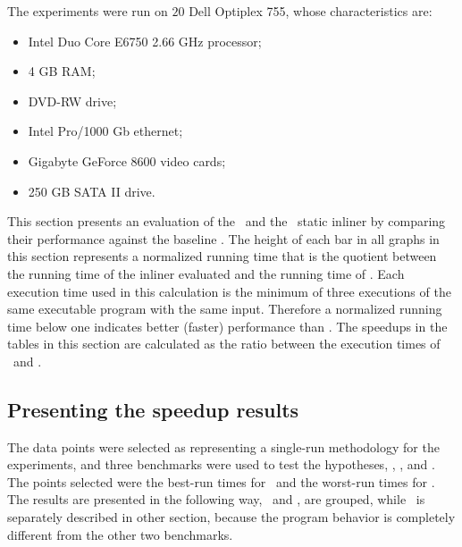 {\begin{itemize}
\end{itemize}



The experiments were run on $20$ Dell Optiplex 755, whose characteristics are:
\begin{itemize}

\item Intel Duo Core E6750 2.66 GHz processor;

\item 4 GB RAM;

\item DVD-RW drive;

\item Intel Pro/1000 Gb ethernet;

\item Gigabyte GeForce 8600 video cards;

\item 250 GB SATA II drive. 

\end{itemize}
}


This section presents an evaluation of the \FDI\  and the \llvm\ static inliner by comparing their performance against the baseline \Never. 
The height of each bar in all graphs in this section represents a normalized running time that is the quotient between the running time of the inliner evaluated and the running time of \Never. Each execution time used in this calculation is the minimum of three executions of the same executable program with the same input.
Therefore a normalized running time below one indicates better (faster) performance than \Never.
The speedups in the tables in this section are calculated as the ratio between the execution times of \FDI\ and \llvm.%

\subsection{Presenting the speedup results}
\label{sec:speedupresult}

The data points were selected as representing a single-run methodology for the experiments, and three benchmarks were used to test the hypotheses, \bzip, \gzip, and \gcc. The points selected were the best-run times for \FDI\ and the worst-run times for \llvm. The results are presented in the following way, \bzip\ and \gzip, are grouped, while \gcc\ is separately described in other section, because the program behavior is completely different from the other two benchmarks.

